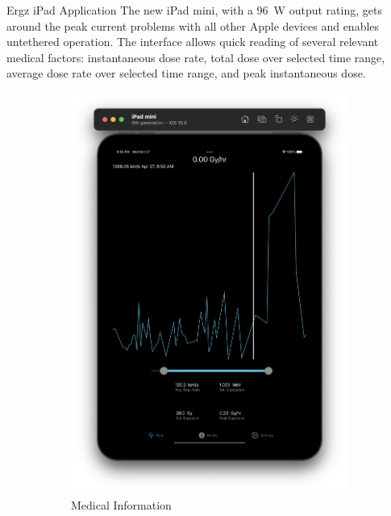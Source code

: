 \documentclass{beamer}
\begin{document}
\begin{frame}
\begin{columns}[t]
    \begin{column}{0.38\linewidth}
      \begin{block}{Ergz iPad Application}
        The new iPad mini, with a \SI{96}{W} output rating, gets around the peak current problems with all other Apple devices and enables untethered operation. The interface allows quick reading of several relevant medical factors: instantaneous dose rate, total dose over selected time range, average dose rate over selected time range, and peak instantaneous dose.
        \begin{figure}
          \centering
          \begin{subfigure}{.5\textwidth}
            \centering
            \includegraphics[width=.9\linewidth]{screen1.png}
            \caption{Medical Information}
          \end{subfigure}%
          \begin{subfigure}{.5\textwidth}
            \centering

\end{subfigure}
\end{figure}
\end{block}
\end{column}
\end{columns}
\end{frame}
\end{document}
